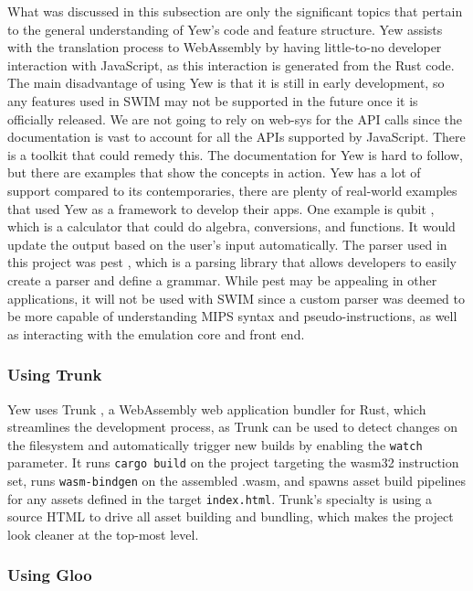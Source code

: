 \documentclass[
    paper=letter,
    parskip=half,
    fontsize=12pt,
    titlepage=firstiscover,
    toc=bibliography,
    numbers=endperiod
]{scrartcl}
\begin{document}
What was discussed in this subsection are only the significant topics
that pertain to the general understanding of Yew's code and feature
structure. Yew assists with the translation process to WebAssembly by
having little-to-no developer interaction with JavaScript, as this
interaction is generated from the Rust code. The main disadvantage of
using Yew is that it is still in early development, so any features used
in SWIM may not be supported in the future once it is officially
released. We are not going to rely on web-sys for the API calls since
the documentation is vast to account for all the APIs supported by
JavaScript. There is a toolkit that could remedy this. The documentation
for Yew is hard to follow, but there are examples that show the concepts
in action. Yew has a lot of support compared to its contemporaries,
there are plenty of real-world examples that used Yew as a framework to
develop their apps. One example is qubit \cite{qubit}, which is a
calculator that could do algebra, conversions, and functions. It would
update the output based on the user's input automatically. The parser
used in this project was pest \cite{pest}, which is a parsing library
that allows developers to easily create a parser and define a grammar.
While pest may be appealing in other applications, it will not be used
with SWIM since a custom parser was deemed to be more capable of
understanding MIPS syntax and pseudo-instructions, as well as
interacting with the emulation core and front end.

\subsubsection{Using Trunk}

Yew uses Trunk \cite{trunk}, a WebAssembly web application bundler for
Rust, which streamlines the development process, as Trunk can be used to
detect changes on the filesystem and automatically trigger new builds by
enabling the \texttt{watch} parameter. It runs \texttt{cargo build} on
the project targeting the wasm32 instruction set, runs
\texttt{wasm-bindgen} on the assembled .wasm, and spawns asset build
pipelines for any assets defined in the target \texttt{index.html}.
Trunk's specialty is using a source HTML to drive all asset building and
bundling, which makes the project look cleaner at the top-most level.

\subsubsection{Using Gloo}
\end{document}
